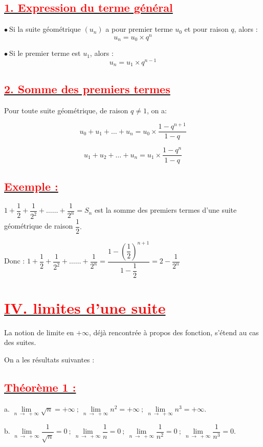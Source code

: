 \documentclass[12pt]{article}
\begin{document}
\subsection*{\underline{\textbf{\textcolor{red}{1. Expression du terme général}}}}
$\bullet\ $Si la suite géométrique $\left(u_{n}\right)$ a pour premier terme $u_{0}$ et pour raison $q$, alors : $$u_{n}=u_{0}\times q^{n}$$

$\bullet\ $Si le premier terme est $u_{1}$, alors :$$u_{n}=u_{1}\times q^{n-1}$$
\subsection*{\underline{\textbf{\textcolor{red}{2. Somme des premiers termes }}}}

Pour toute suite géométrique, de raison $q\neq 1$, on a:

$$u_{0}+u_{1}+\ldots+u_{n}=u_{0}\times\dfrac{1-q^{n+1}}{1-q}$$

$$u_{1}+u_{2}+\ldots+u_{n}=u_{1}\times\dfrac{1-q^{n}}{1-q}$$

\subsection*{\underline{\textbf{\textcolor{red}{Exemple :}}}}
$1+\dfrac{1}{2}+\dfrac{1}{2^{2}}+\ldots\ldots+\dfrac{1}{2^{n}}=S_{n}$ est la somme des premiers termes d'une suite géométrique de raison $\dfrac{1}{2}.$ 

Donc : $1+\dfrac{1}{2}+\dfrac{1}{2^{2}}+\ldots\ldots+\dfrac{1}{2^{n}}=\dfrac{1-\left(\dfrac{1}{2}\right)^{n+1}}{1-\dfrac{1}{2}}=2-\dfrac{1}{2^{n}}$
\section*{\underline{\textbf{\textcolor{red}{IV. limites d'une suite}}}}
La notion de limite en $+\infty$, déjà rencontrée à propos des fonction, s'étend au cas des suites.
	
On a les résultats suivantes :
\subsection*{\underline{\textbf{\textcolor{red}{Théorème 1 :}}}}
a. $\lim\limits_{n\;\longrightarrow\;+\infty}\sqrt{n}=+\infty\ ;\ \lim\limits_{n\;\longrightarrow\;+\infty}n^{2}=+\infty\ ;\ \lim\limits_{n\;\longrightarrow\;+\infty}n^{3}=+\infty.$

b. $\lim\limits_{n\;\longrightarrow\;+\infty}\dfrac{1}{\sqrt{n}}=0\ ;\ \lim\limits_{n\;\longrightarrow\;+\infty}\dfrac{1}{n}=0\ ;\ \lim\limits_{n\;\longrightarrow\;+\infty}\dfrac{1}{n^{2}}=0\ ;\ \lim\limits_{n\;\longrightarrow\;+\infty}\dfrac{1}{n^{3}}=0.$
\end{document}
